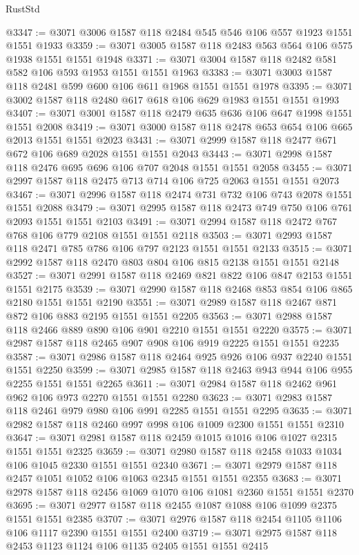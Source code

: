 \begin{lexlean}{RustStd}
\begin{coremodule}
@3347 := @3071 @3006 @1587 @118 @2484 @545 @546 @106 @557 @1923 @1551 @1551 @1933
@3359 := @3071 @3005 @1587 @118 @2483 @563 @564 @106 @575 @1938 @1551 @1551 @1948
@3371 := @3071 @3004 @1587 @118 @2482 @581 @582 @106 @593 @1953 @1551 @1551 @1963
@3383 := @3071 @3003 @1587 @118 @2481 @599 @600 @106 @611 @1968 @1551 @1551 @1978
@3395 := @3071 @3002 @1587 @118 @2480 @617 @618 @106 @629 @1983 @1551 @1551 @1993
@3407 := @3071 @3001 @1587 @118 @2479 @635 @636 @106 @647 @1998 @1551 @1551 @2008
@3419 := @3071 @3000 @1587 @118 @2478 @653 @654 @106 @665 @2013 @1551 @1551 @2023
@3431 := @3071 @2999 @1587 @118 @2477 @671 @672 @106 @689 @2028 @1551 @1551 @2043
@3443 := @3071 @2998 @1587 @118 @2476 @695 @696 @106 @707 @2048 @1551 @1551 @2058
@3455 := @3071 @2997 @1587 @118 @2475 @713 @714 @106 @725 @2063 @1551 @1551 @2073
@3467 := @3071 @2996 @1587 @118 @2474 @731 @732 @106 @743 @2078 @1551 @1551 @2088
@3479 := @3071 @2995 @1587 @118 @2473 @749 @750 @106 @761 @2093 @1551 @1551 @2103
@3491 := @3071 @2994 @1587 @118 @2472 @767 @768 @106 @779 @2108 @1551 @1551 @2118
@3503 := @3071 @2993 @1587 @118 @2471 @785 @786 @106 @797 @2123 @1551 @1551 @2133
@3515 := @3071 @2992 @1587 @118 @2470 @803 @804 @106 @815 @2138 @1551 @1551 @2148
@3527 := @3071 @2991 @1587 @118 @2469 @821 @822 @106 @847 @2153 @1551 @1551 @2175
@3539 := @3071 @2990 @1587 @118 @2468 @853 @854 @106 @865 @2180 @1551 @1551 @2190
@3551 := @3071 @2989 @1587 @118 @2467 @871 @872 @106 @883 @2195 @1551 @1551 @2205
@3563 := @3071 @2988 @1587 @118 @2466 @889 @890 @106 @901 @2210 @1551 @1551 @2220
@3575 := @3071 @2987 @1587 @118 @2465 @907 @908 @106 @919 @2225 @1551 @1551 @2235
@3587 := @3071 @2986 @1587 @118 @2464 @925 @926 @106 @937 @2240 @1551 @1551 @2250
@3599 := @3071 @2985 @1587 @118 @2463 @943 @944 @106 @955 @2255 @1551 @1551 @2265
@3611 := @3071 @2984 @1587 @118 @2462 @961 @962 @106 @973 @2270 @1551 @1551 @2280
@3623 := @3071 @2983 @1587 @118 @2461 @979 @980 @106 @991 @2285 @1551 @1551 @2295
@3635 := @3071 @2982 @1587 @118 @2460 @997 @998 @106 @1009 @2300 @1551 @1551 @2310
@3647 := @3071 @2981 @1587 @118 @2459 @1015 @1016 @106 @1027 @2315 @1551 @1551 @2325
@3659 := @3071 @2980 @1587 @118 @2458 @1033 @1034 @106 @1045 @2330 @1551 @1551 @2340
@3671 := @3071 @2979 @1587 @118 @2457 @1051 @1052 @106 @1063 @2345 @1551 @1551 @2355
@3683 := @3071 @2978 @1587 @118 @2456 @1069 @1070 @106 @1081 @2360 @1551 @1551 @2370
@3695 := @3071 @2977 @1587 @118 @2455 @1087 @1088 @106 @1099 @2375 @1551 @1551 @2385
@3707 := @3071 @2976 @1587 @118 @2454 @1105 @1106 @106 @1117 @2390 @1551 @1551 @2400
@3719 := @3071 @2975 @1587 @118 @2453 @1123 @1124 @106 @1135 @2405 @1551 @1551 @2415

\end{coremodule}
\end{lexlean}
